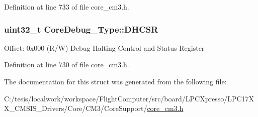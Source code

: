 \-Definition at line 733 of file core\-\_\-cm3.\-h.

\hypertarget{struct_core_debug___type_a25c14c022c73a725a1736e903431095d}{
\subsubsection[{\-D\-H\-C\-S\-R}]{ uint32\-\_\-t {\bf \-Core\-Debug\-\_\-\-Type\-::\-D\-H\-C\-S\-R}}}\label{struct_core_debug___type_a25c14c022c73a725a1736e903431095d}
\-Offset\-: 0x000 (\-R/\-W) \-Debug \-Halting \-Control and \-Status \-Register 

\-Definition at line 730 of file core\-\_\-cm3.\-h.



\-The documentation for this struct was generated from the following file\-:\begin{DoxyCompactItemize}
\item 
\-C\-:/tesis/localwork/workspace/\-Flight\-Computer/src/board/\-L\-P\-C\-Xpresso/\-L\-P\-C17\-X\-X\-\_\-\-C\-M\-S\-I\-S\-\_\-\-Drivers/\-Core/\-C\-M3/\-Core\-Support/\hyperlink{core__cm3_8h}{core\-\_\-cm3.\-h}\end{DoxyCompactItemize}
